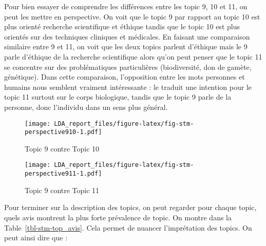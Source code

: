 \documentclass[
  letterpaper,
  DIV=11,
  numbers=noendperiod]{scrartcl}
\begin{document}
Pour bien essayer de comprendre les différences entre les topic 9, 10 et
11, on peut les mettre en perspective. On voit que le topic 9 par
rapport au topic 10 est plus orienté recherche scientifique et éthique
tandis que le topic 10 est plus orientés sur des techniques cliniques et
médicales. En faisant une comparaison similaire entre 9 et 11, on voit
que les deux topics parlent d'éthique mais le 9 parle d'éthique de la
recherche scientifique alors qu'on peut penser que le topic 11 se
concentre sur des problématiques particulières (biodiversité, don de
gamète, génétique). Dans cette comparaison, l'opposition entre les mots
personnes et humains nous semblent vraiment intéressante : le traduit
une intention pour le topic 11 surtout sur le corps biologique, tandis
que le topic 9 parle de la personne, donc l'individu dans un sens plus
général.

\begin{figure}

{\centering \texttt{[image: LDA\_report\_files/figure-latex/fig-stm-perspective910-1.pdf]}

}

\caption{\label{fig-stm-perspective910}Topic 9 contre Topic 10}

\end{figure}

\begin{figure}

{\centering \texttt{[image: LDA\_report\_files/figure-latex/fig-stm-perspective911-1.pdf]}

}

\caption{\label{fig-stm-perspective911}Topic 9 contre Topic 11}

\end{figure}

Pour terminer sur la description des topics, on peut regarder pour
chaque topic, quels avis montrent la plus forte prévalence de topic. On
montre dans la Table~\ref{tbl-stm-top_avis}. Cela permet de nuancer
l'imprétation des topics. On peut ainsi dire que :
\end{document}
